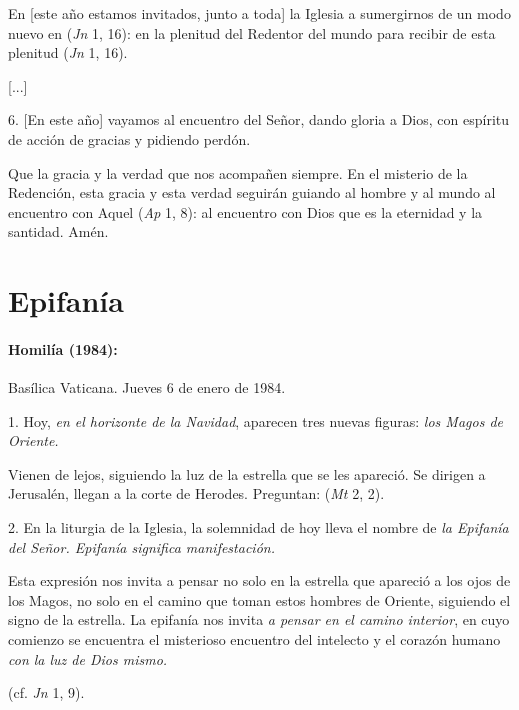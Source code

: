 \begin{body}
	En {[}este año estamos invitados, junto a toda{]} la Iglesia a sumergirnos de un modo nuevo en  (\emph{Jn} 1, 16): en la plenitud del Redentor del mundo para recibir de esta plenitud  (\emph{Jn} 1, 16).
	
	{[}...{]}
	
	6. {[}En este año{]} vayamos al encuentro del Señor, dando gloria a Dios, con espíritu de acción de gracias y pidiendo perdón.
	
	Que la gracia y la verdad que  nos acompañen siempre. En el misterio de la Redención, esta gracia y esta verdad seguirán guiando al hombre y al mundo al encuentro con Aquel  (\emph{Ap} 1, 8): al encuentro con Dios que es la eternidad y la santidad. Amén.
	
	\chapter{Epifanía}
	
	\subsubsection{Homilía (1984): }
	
	Basílica Vaticana. Jueves 6 de enero de 1984.
	
	1. Hoy, \emph{en el horizonte de la Navidad}, aparecen tres nuevas figuras: \emph{los Magos de Oriente.}
	
	Vienen de lejos, siguiendo la luz de la estrella que se les apareció. Se dirigen a Jerusalén, llegan a la corte de Herodes. Preguntan:  (\emph{Mt} 2, 2).
	
	2. En la liturgia de la Iglesia, la solemnidad de hoy lleva el nombre de \emph{la Epifanía del Señor. Epifanía significa manifestación.}
	
	Esta expresión nos invita a pensar no solo en la estrella que apareció a los ojos de los Magos, no solo en el camino que toman estos hombres de Oriente, siguiendo el signo de la estrella. La epifanía nos invita \emph{a pensar en el camino interior}, en cuyo comienzo se encuentra el misterioso encuentro del intelecto y el corazón humano \emph{con la luz de Dios mismo.}
	
	 (cf. \emph{Jn} 1, 9).
	

\end{body}
